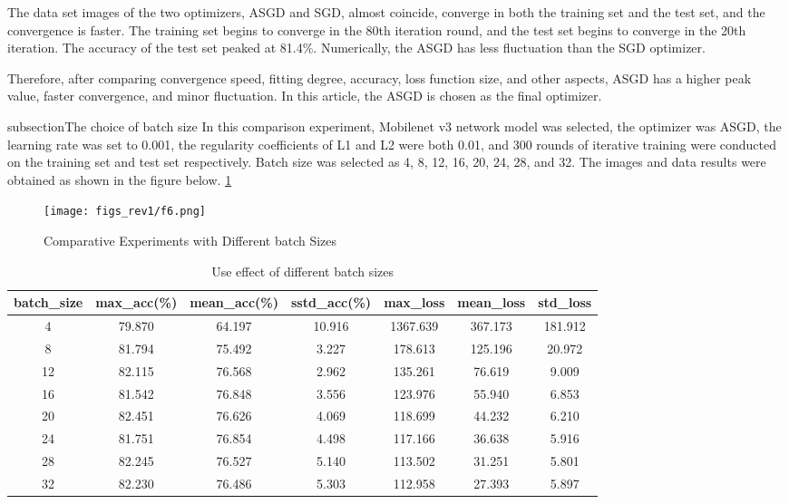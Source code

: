 \documentclass[a4paper,fleqn]{cas-sc}
\begin{document}
The data set images of the two optimizers, ASGD and SGD, almost coincide, converge in both the training set and the test set, and the convergence is faster. The training set begins to converge in the 80th iteration round, and the test set begins to converge in the 20th iteration. The accuracy of the test set peaked at 81.4\%. Numerically, the ASGD has less fluctuation than the SGD optimizer. 

Therefore, after comparing convergence speed, fitting degree, accuracy, loss function size, and other aspects, ASGD has a higher peak value, faster convergence, and minor fluctuation. In this article, the ASGD is chosen as the final optimizer.

subsection{The choice of batch size}
In this comparison experiment, Mobilenet v3 network model was selected, the optimizer was ASGD, the learning rate was set to 0.001, the regularity coefficients of L1 and L2 were both 0.01, and 300 rounds of iterative training were conducted on the training set and test set respectively. Batch size was selected as 4, 8, 12, 16, 20, 24, 28, and 32. The images and data results were obtained as shown in the figure below. \ref{fig:f6}
\begin{figure}
\centering
\texttt{[image: figs\_rev1/f6.png]}
\caption{Comparative Experiments with Different batch Sizes}
\label{fig:f6}
\end{figure}

\begin{table}
\centering
\caption{Use effect of different batch sizes}
\label{tab:mbv5}
\begin{tabular}{ccccccc}
\hline 
batch\_size & max\_acc(\%) & mean\_acc(\%) & sstd\_acc(\%) & max\_loss & mean\_loss & std\_loss \\
\hline  
4   & 79.870 &  64.197  & 10.916 &  1367.639  & 367.173 & 181.912 \\
 8   & 81.794  & 75.492 & 3.227 &  178.613  & 125.196 & 20.972 \\
 12   & 82.115   & 76.568 & 2.962 &  135.261  & 76.619 & 9.009 \\
 16  & 81.542   & 76.848 & 3.556 &  123.976  & 55.940 & 6.853 \\
 20  &  82.451  & 76.626 & 4.069 &  118.699  & 44.232 & 6.210 \\
 24  & 81.751  & 76.854 & 4.498 &  117.166  & 36.638 & 5.916 \\
 28  & 82.245  & 76.527 & 5.140 &  113.502  & 31.251 & 5.801 \\
 32  & 82.230  & 76.486 & 5.303 &  112.958  & 27.393 & 5.897 \\
\hline
\end{tabular}
\end{table}
\end{document}
